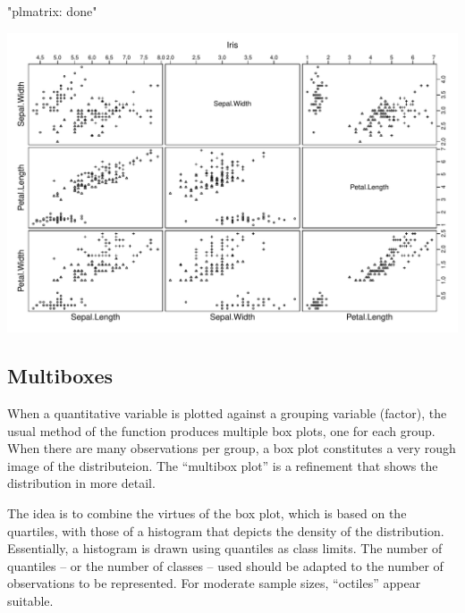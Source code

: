 \documentclass[11pt]{article}
\begin{document}
\Bfig
\begin{Schunk}
\begin{Soutput}
[1] "plmatrix: done"
\end{Soutput}
\end{Schunk}
\includegraphics{regr-description-plmatrix}

\subsection{Multiboxes}

When a quantitative variable is plotted against a grouping variable
(factor), the usual  method of the  function produces
multiple box plots, one for each group. When there are many observations
per group, a box plot constitutes a very rough image of the distributeion.
The ``multibox plot'' is a refinement that shows the distribution in more
detail. 

The idea is to combine the virtues of the box plot, which is based on the
quartiles, with those of a histogram that depicts the density of the
distribution. 
Essentially, a histogram is drawn using quantiles as class limits.
The number of quantiles -- or the number of classes -- used should be
adapted to the number of observations to be represented.
For moderate sample sizes, ``octiles'' appear suitable.
\end{document}
